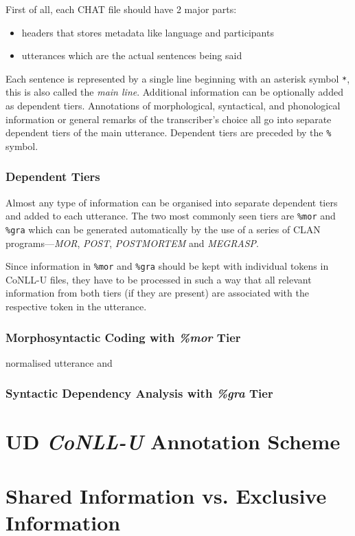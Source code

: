 First of all, each CHAT file should have 2 major parts:\\
\begin{itemize}
	\item headers that stores metadata like language and participants
	\item utterances which are the actual sentences being said
\end{itemize}
Each sentence is represented by a single line beginning with an asterisk symbol \texttt{*}, this is also called the \emph{main line}. Additional information can be optionally added as dependent tiers. Annotations of morphological, syntactical, and phonological information or general remarks of the transcriber's
choice all go into separate dependent tiers of the main utterance. Dependent tiers are preceded by the \texttt{\%} symbol.
\subsubsection{Dependent Tiers}
Almost any type of information can be organised into separate dependent tiers and added to each utterance. The two most commonly seen tiers are \texttt{\%mor} and \texttt{\%gra} which can be generated automatically by the use of a series of CLAN programs---\emph{MOR}, \emph{POST}, \emph{POSTMORTEM} and \emph{MEGRASP}.

Since information in \texttt{\%mor} and \texttt{\%gra} should be kept with individual tokens in CoNLL-U files, they have to be processed in such a way that all relevant information from both tiers (if they are present) are associated with the respective token in the utterance.

\subsubsection{Morphosyntactic Coding with \emph{\%mor} Tier}
normalised utterance and %

\subsubsection{Syntactic Dependency Analysis with \emph{\%gra} Tier}

\section{UD \emph{CoNLL-U} Annotation Scheme}

\section{Shared Information vs. Exclusive Information}
